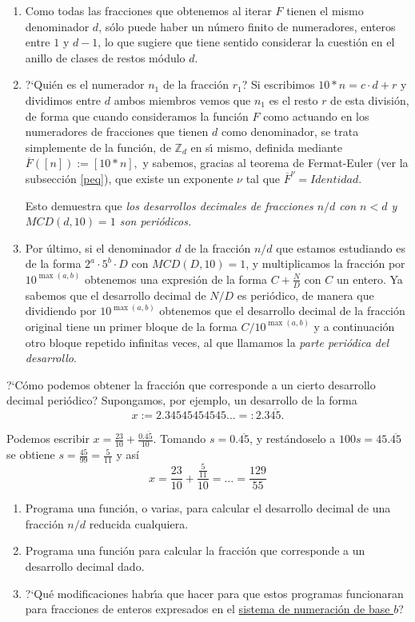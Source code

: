 \begin{enumerate}
\item Como todas las fracciones que obtenemos al iterar $F$ tienen el mismo
denominador $d$, s\'olo puede haber un n\'umero finito de numeradores, enteros
entre $1$ y $d-1$, lo que sugiere que tiene sentido considerar la cuesti\'on en
el anillo de clases de restos m\'odulo $d$. 

\item ?`Qui\'en es el numerador $n_1$ de la fracci\'on $r_1$? Si escribimos
$10*n=c\cdot d+r$ y dividimos entre $d$ ambos miembros vemos que $n_1$ es el
resto $r$ de esta divisi\'on, de forma que cuando consideramos la funci\'on $F$
como actuando en los numeradores de fracciones que tienen $d$ como denominador,
se trata simplemente de la funci\'on, de $\mathbb{Z}_d$ en s\'{\i} mismo,  
definida mediante $\overline{F}([n]):=[10*n],$ y sabemos, gracias al teorema de
Fermat-Euler
(ver la subsecci\'on \ref{peq}), que existe un exponente $\nu$ tal que
$\overline{F}^{\nu}=Identidad.$

Esto demuestra que {\itshape los desarrollos decimales de fracciones $n/d$ con
$n<d$ y $MCD(d,10)=1$ son peri\'odicos.}

\item Por \'ultimo, si el denominador $d$ de la fracci\'on $n/d$ que estamos
estudiando es de la forma $2^a\cdot 5^b\cdot D$ con $MCD(D,10)=1$, y
multiplicamos la fracci\'on por $10^{\max(a,b)}$ obtenemos una expresi\'on de la
forma $C+\frac{N}{D}$ con $C$ un entero. Ya sabemos que el desarrollo decimal de
$N/D$ es peri\'odico, de manera que dividiendo por 
$10^{\max(a,b)}$ obtenemos que el desarrollo decimal de la fracci\'on original
tiene un primer bloque de la forma $C/10^{\max(a,b)}$ y a continuaci\'on
otro bloque repetido infinitas veces,  al que llamamos la {\itshape parte
peri\'odica del desarrollo}. 
\end{enumerate}

?`C\'omo podemos obtener la fracci\'on que corresponde a un cierto desarrollo
decimal peri\'odico?  Supongamos, por ejemplo, un desarrollo de la forma 
\[x:=2{.}34545454545\dots=:2{.}3\overline{45}.\]

Podemos escribir $x=\frac{23}{10}+\frac{0{.}\overline{45}}{10}$. Tomando 
$s=0{.}\overline{45}$, y restándoselo a \(100s=45{.}\overline{45}\)
se obtiene $s=\frac{45}{99}=\frac5{11}$ y así
\[x=\frac{23}{10}+\frac{\frac{5}{11}}{10}=\dots=\frac{129}{55}
\]


\begin{ejer}
\begin{enumerate}
 \item  Programa una funci\'on, o varias, para calcular el desarrollo decimal de
una fracci\'on $n/d$ reducida cualquiera.
 \item Programa una funci\'on para calcular la fracci\'on que corresponde a un
desarrollo decimal dado.
 \item ?`Qu\'e modificaciones habr\'{\i}a que hacer para que estos programas
funcionaran para fracciones de enteros expresados en el
\hyperref[bases-num]{sistema de numeraci\'on
de base $b$}?
 
\end{enumerate}


\end{ejer}

